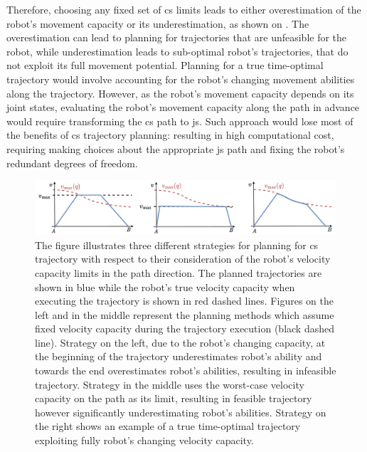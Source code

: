 Therefore, choosing any fixed set of \gls{cs} limits leads to either overestimation of the robot's movement capacity or its underestimation, as shown on . The overestimation can lead to planning for trajectories that are unfeasible for the robot, while underestimation leads to sub-optimal robot's trajectories, that do not exploit its full movement potential. Planning for a true time-optimal trajectory would involve accounting for the robot's changing movement abilities along the trajectory. However, as the robot's movement capacity depends on its joint states, evaluating the robot's movement capacity along the path in advance would require transforming the \gls{cs} path to \gls{js}. Such approach would lose most of the benefits of \gls{cs} trajectory planning: resulting in high computational cost, requiring making choices about the appropriate \gls{js} path and fixing the robot's redundant degrees of freedom.


\begin{figure}[!t]
    \centering 
    \includegraphics[width=\linewidth]{Papers/imgs/unre_over_poly.pdf}
    \caption{The figure illustrates three different strategies for planning for \gls{cs} trajectory with respect to their consideration of the robot's velocity capacity limits in the path direction. The planned trajectories are shown in blue while the robot's true velocity capacity when executing the trajectory is shown in red dashed lines. Figures on the left  and in the middle represent the planning methods which assume fixed velocity capacity during the trajectory execution (black dashed line). Strategy on the left, due to the robot's changing capacity, at the beginning of the trajectory underestimates robot's ability and towards the end overestimates robot's abilities, resulting in infeasible trajectory. Strategy in the middle uses the worst-case velocity capacity on the path as its limit, resulting in feasible trajectory however significantly underestimating robot's abilities. Strategy on the right shows an example of a true time-optimal trajectory exploiting fully robot's changing velocity capacity. }
    \label{fig:under_over}
\end{figure}

